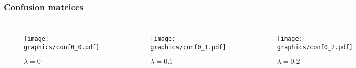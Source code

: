 \documentclass[10pt]{beamer}
\begin{document}
\begin{frame} \frametitle{Confusion matrices}

  \begin{columns}[c]
  \begin{figure}[htbp]
    \centering
      \texttt{[image: graphics/conf0\_0.pdf]}
    \caption{$\lambda = 0$}
    \label{fig:graphics_conf0.0}
  \end{figure}
  
  \begin{figure}[htbp]
    \centering
      \texttt{[image: graphics/conf0\_1.pdf]}
    \caption{$\lambda = 0.1$}
    \label{fig:graphics_conf0.1}
  \end{figure}  
  
  
  \begin{figure}[htbp]
    \centering
      \texttt{[image: graphics/conf0\_2.pdf]}
    \caption{$\lambda = 0.2$}
    \label{fig:graphics_conf0_2}
  \end{figure}
  
  \begin{figure}[htbp]
    \centering
      \texttt{[image: graphics/conf0\_5.pdf]}
    \caption{$\lambda = 0.5$}
    \label{fig:graphics_conf0_5}
  \end{figure}
  
  
  \begin{figure}[htbp]
    \centering
      \texttt{[image: graphics/conf1\_0.pdf]}
    \caption{$\lambda = 1$}
    \label{fig:graphics_conf1_0}
  \end{figure}
  

  \end{columns}


\end{frame}
\end{document}
